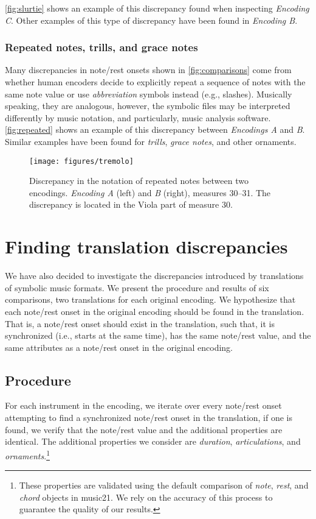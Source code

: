 \autoref{fig:slurtie} shows an example of this discrepancy found when inspecting \emph{Encoding C}. Other examples of this type of discrepancy have been found in \emph{Encoding B}.

\subsubsection{Repeated notes, trills, and grace notes}
Many discrepancies in note/rest onsets shown in \autoref{fig:comparisons} come from whether human encoders decide to explicitly repeat a sequence of notes with the same note value or use \emph{abbreviation} symbols instead (e.g., slashes). Musically speaking, they are analogous, however, the symbolic files may be interpreted differently by music notation, and particularly, music analysis software. \autoref{fig:repeated} shows an example of this discrepancy between \emph{Encodings A} and \emph{B}. Similar examples have been found for \emph{trills}, \emph{grace notes}, and other ornaments.

\begin{figure}[h]
\texttt{[image: figures/tremolo]}
\caption{Discrepancy in the notation of repeated notes between two encodings. \emph{Encoding A} (left) and \emph{B} (right), measures 30--31. The discrepancy is located in the Viola part of measure 30.}
\label{fig:repeated}
\end{figure}

\section{Finding translation discrepancies}
We have also decided to investigate the discrepancies introduced by translations of symbolic music formats. We present the procedure and results of six comparisons, two translations for each original encoding. We hypothesize that each note/rest onset in the original encoding should be found in the translation. That is, a note/rest onset should exist in the translation, such that, it is synchronized (i.e., starts at the same time), has the same note/rest value, and the same attributes as a note/rest onset in the original encoding.

\subsection{Procedure}
For each instrument in the encoding, we iterate over every note/rest onset attempting to find a synchronized note/rest onset in the translation, if one is found, we verify that the note/rest value and the additional properties are identical. The additional properties we consider are \emph{duration}, \emph{articulations}, and \emph{ornaments}.\footnote{These properties are validated using the default comparison of \emph{note}, \emph{rest}, and \emph{chord} objects in music21. We rely on the accuracy of this process to guarantee the quality of our results.}

